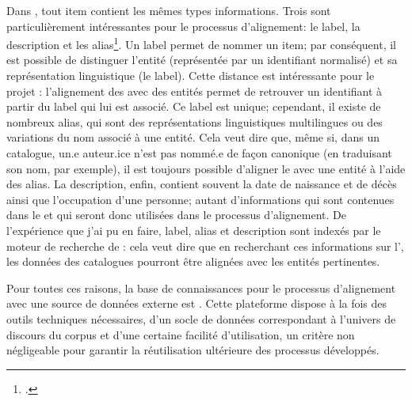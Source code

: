 Dans \wkd{}, tout item contient les mêmes types informations. Trois sont particulièrement intéressantes pour le processus d'alignement: le label, la description et les alias\footcite[p. 52]{mika_introducing_2014}. Un label permet de nommer un item; par conséquent, il est possible de distinguer l'entité (représentée par un identifiant normalisé) et sa représentation linguistique (le label). Cette distance est intéressante pour le projet \ktb{}: l'alignement des \tname{} avec des entités \wkd{} permet de retrouver un identifiant à partir du label qui lui est associé. Ce label est unique; cependant, il existe de nombreux alias, qui sont des représentations linguistiques multilingues ou des variations du nom associé à une entité. Cela veut dire que, même si, dans un catalogue, un.e auteur.ice n'est pas nommé.e de façon canonique (en traduisant son nom, par exemple), il est toujours possible d'aligner le \tname{} avec une entité \wkd{} à l'aide des alias. La description, enfin, contient souvent la date de naissance et de décès ainsi que l'occupation d'une personne; autant d'informations qui sont contenues dans le \ttrait{} et qui seront donc utilisées dans le processus d'alignement. De l'expérience que j'ai pu en faire, label, alias et description sont indexés par le moteur de recherche de \wkd{}: cela veut dire que en recherchant ces informations sur l'\api{}, les données des catalogues pourront être alignées avec les entités pertinentes.

Pour toutes ces raisons, la base de connaissances pour le processus d'alignement avec une source de données externe est \wkd{}. Cette plateforme dispose à la fois des outils techniques nécessaires, d'un socle de données correspondant à l'univers de discours du corpus et d'une certaine facilité d'utilisation, un critère non négligeable pour garantir la réutilisation ultérieure des processus développés.

